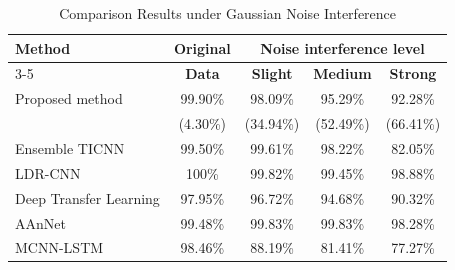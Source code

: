 \documentclass[journal]{IEEEtran}
\begin{document}
\begin{table}[!t]
\caption{Comparison Results under Gaussian Noise Interference}
\label{tab:gaussian_noise_comparison}
\centering
\begin{tabular}{l c c c c}
\toprule
\multirow{2}{*}{\textbf{Method}} & \textbf{Original} & \multicolumn{3}{c}{\textbf{Noise interference level}} \\
\cmidrule(lr){3-5}
 & \textbf{Data} & \textbf{Slight} & \textbf{Medium} & \textbf{Strong} \\
\midrule
Proposed method & 99.90\% & 98.09\% & 95.29\% & 92.28\% \\
 & (4.30\%) & (34.94\%) & (52.49\%) & (66.41\%) \\
\addlinespace
Ensemble TICNN \cite{ref23} & 99.50\% & 99.61\% & 98.22\% & 82.05\% \\
LDR-CNN \cite{ref26} & 100\% & 99.82\% & 99.45\% & 98.88\% \\
Deep Transfer Learning \cite{ref28} & 97.95\% & 96.72\% & 94.68\% & 90.32\% \\
AAnNet \cite{ref27} & 99.48\% & 99.83\% & 99.83\% & 98.28\% \\
MCNN-LSTM \cite{ref29} & 98.46\% & 88.19\% & 81.41\% & 77.27\% \\
\bottomrule
\end{tabular}
\end{table}
\end{document}
